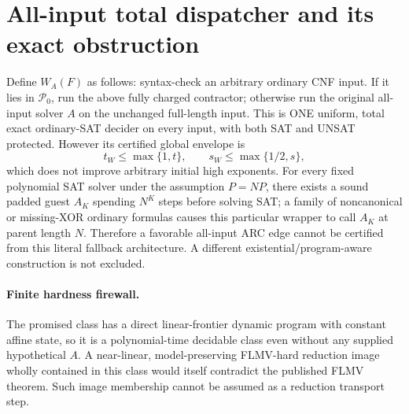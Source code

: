 \documentclass[11pt]{article}
\newcommand{\PATH}{\mathcal P}
\begin{document}
\section{All-input total dispatcher and its exact obstruction}
Define $W_A(F)$ as follows: syntax-check an arbitrary ordinary CNF input.
If it lies in $\PATH_0$, run the above fully charged contractor; otherwise
run the original all-input solver $A$ on the unchanged full-length input.
This is ONE uniform, total exact ordinary-SAT decider on every input,
with both SAT and UNSAT protected. However its certified global envelope is
\[
 t_W\le\max\{1,t\},\qquad s_W\le\max\{1/2,s\},
\]
which does not improve arbitrary initial high exponents.
For every fixed polynomial SAT solver under the assumption $P=NP$,
there exists a sound padded guest $A_K$ spending $N^K$ steps before
solving SAT; a family of noncanonical or missing-XOR ordinary formulas
causes this particular wrapper to call $A_K$ at parent length $N$.
Therefore a favorable all-input ARC edge cannot be certified from this
literal fallback architecture. A different existential/program-aware
construction is not excluded.

\paragraph{Finite hardness firewall.}
The promised class has a direct linear-frontier dynamic program with
constant affine state, so it is a polynomial-time decidable class even
without any supplied hypothetical $A$. A near-linear, model-preserving
FLMV-hard reduction image wholly contained in this class would itself
contradict the published FLMV theorem. Such image membership cannot be
assumed as a reduction transport step.
\end{document}
